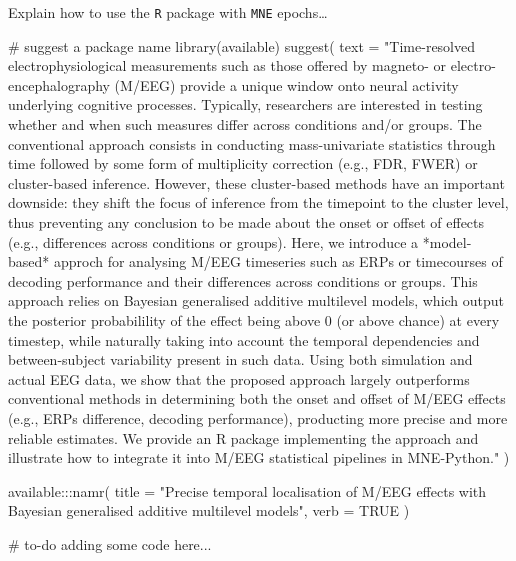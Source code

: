\documentclass[
  doc,
  floatsintext,
  longtable,
  a4paper,
  nolmodern,
  notxfonts,
  notimes,
  colorlinks=true,linkcolor=blue,citecolor=blue,urlcolor=blue]{apa7}
\newenvironment{Shaded}{\begin{snugshade}}{\end{snugshade}}
\newcommand{\AttributeTok}[1]{\textcolor[rgb]{0.40,0.45,0.13}{#1}}
\newcommand{\CommentTok}[1]{\textcolor[rgb]{0.37,0.37,0.37}{#1}}
\newcommand{\ConstantTok}[1]{\textcolor[rgb]{0.56,0.35,0.01}{#1}}
\newcommand{\FunctionTok}[1]{\textcolor[rgb]{0.28,0.35,0.67}{#1}}
\newcommand{\NormalTok}[1]{\textcolor[rgb]{0.00,0.23,0.31}{#1}}
\newcommand{\SpecialCharTok}[1]{\textcolor[rgb]{0.37,0.37,0.37}{#1}}
\newcommand{\StringTok}[1]{\textcolor[rgb]{0.13,0.47,0.30}{#1}}
\begin{document}
Explain how to use the \texttt{R} package with \texttt{MNE}
epochs\ldots{}

\begin{Shaded}
\begin{Highlighting}[]
\CommentTok{\# suggest a package name}
\FunctionTok{library}\NormalTok{(available)}
\FunctionTok{suggest}\NormalTok{(}
    \AttributeTok{text =} \StringTok{"Time{-}resolved electrophysiological measurements such as those offered by magneto{-} or electro{-}encephalography (M/EEG) provide a unique window onto neural activity underlying cognitive processes. Typically, researchers are interested in testing whether and when such measures differ across conditions and/or groups. The conventional approach consists in conducting mass{-}univariate statistics through time followed by some form of multiplicity correction (e.g., FDR, FWER) or cluster{-}based inference. However, these cluster{-}based methods have an important downside: they shift the focus of inference from the timepoint to the cluster level, thus preventing any conclusion to be made about the onset or offset of effects (e.g., differences across conditions or groups). Here, we introduce a *model{-}based* approch for analysing M/EEG timeseries such as ERPs or timecourses of decoding performance and their differences across conditions or groups. This approach relies on Bayesian generalised additive multilevel models, which output the posterior probabilility of the effect being above 0 (or above chance) at every timestep, while naturally taking into account the temporal dependencies and between{-}subject variability present in such data. Using both simulation and actual EEG data, we show that the proposed approach largely outperforms conventional methods in determining both the onset and offset of M/EEG effects (e.g., ERPs difference, decoding performance), producting more precise and more reliable estimates. We provide an R package implementing the approach and illustrate how to integrate it into M/EEG statistical pipelines in MNE{-}Python."}
\NormalTok{    )}

\NormalTok{available}\SpecialCharTok{:::}\FunctionTok{namr}\NormalTok{(}
    \AttributeTok{title =} \StringTok{"Precise temporal localisation of M/EEG effects with Bayesian generalised additive multilevel models"}\NormalTok{,}
    \AttributeTok{verb =} \ConstantTok{TRUE}
\NormalTok{    )}

\CommentTok{\# to{-}do adding some code here...}
\end{Highlighting}
\end{Shaded}
\end{document}
